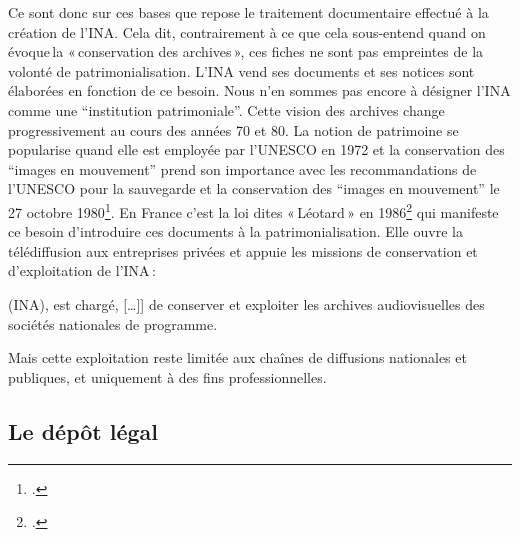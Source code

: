 Ce sont donc sur ces bases que repose le traitement documentaire effectué à la création de l’INA. Cela dit, contrairement à ce que cela sous-entend quand on évoque la « conservation des archives », ces fiches ne sont pas empreintes de la volonté de patrimonialisation. L’INA vend ses documents et ses notices sont élaborées en fonction de ce besoin. Nous n'en sommes pas encore à désigner l'INA comme une \enquote{institution patrimoniale}. Cette vision des archives change progressivement au cours des années 70 et 80. La notion de patrimoine se popularise quand elle est employée par l'UNESCO en 1972 et la conservation des \enquote{images en mouvement} prend son importance avec les recommandations de l'UNESCO pour la sauvegarde et la conservation des \enquote{images en mouvement} le 27 octobre 1980\footcite[]{unesco}. En France c'est la loi dites « Léotard » en 1986\footcite[]{zotero-item-334} qui manifeste ce besoin d'introduire ces documents à la patrimonialisation. Elle ouvre la télédiffusion aux entreprises privées et appuie les missions de conservation et d’exploitation de l’INA :
\begin{displayquote}
	(INA), est chargé, [\dots]] de conserver et exploiter les archives audiovisuelles des sociétés nationales de programme. 
\end{displayquote}
Mais cette exploitation reste limitée aux chaînes de diffusions nationales et publiques, et uniquement à des fins professionnelles. 

\subsection{Le dépôt légal}

